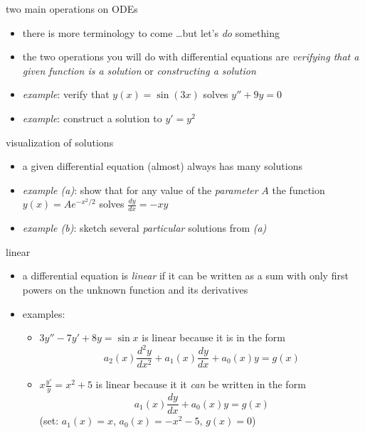 \documentclass{beamer}
\begin{document}
\begin{frame}{two main operations on ODEs}

\begin{itemize}
\item there is more terminology to come \dots but let's \emph{do} something
\item the two operations you will do with differential equations are \emph{verifying that a given function is a solution} or \emph{constructing a solution}
\item \emph{example}:  verify that $y(x) = \sin(3 x)$ solves $y''+9y=0$

\vspace{10mm}
\item \emph{example}:  construct a solution to $y'=y^2$

\vspace{10mm}
\end{itemize}
\end{frame}

\begin{frame}{visualization of solutions}

\begin{itemize}
\item a given differential equation (almost) always has many solutions
\item \emph{example (a)}: show that for any value of the \emph{parameter} $A$ the function $y(x) = A e^{-x^2/2}$ solves $\frac{dy}{dx} = - x y$

\vspace{15mm}
\item \emph{example (b)}: sketch several \emph{particular} solutions from \emph{(a)}

\vspace{25mm}

\phantom{foo}
\end{itemize}
\end{frame}


\begin{frame}{linear}

\begin{itemize}
\item a differential equation is \emph{linear} if it can be written as a sum with only first powers on the unknown function and its derivatives
\item examples:
    \begin{itemize}
    \item $3 y'' - 7 y' + 8 y = \sin x$ is linear because it is in the form
        $$a_2(x) \frac{d^2y}{dx^2} + a_1(x) \frac{dy}{dx} + a_0(x) y = g(x)$$
    \item $x \frac{y'}{y} = x^2 + 5$ is linear because it it \emph{can} be written in the form
        $$a_1(x) \frac{dy}{dx} + a_0(x) y = g(x)$$
    (set: $a_1(x)=x$, $a_0(x)=-x^2-5$, $g(x)=0$)
    \end{itemize}
\end{itemize}
\end{frame}
\end{document}
